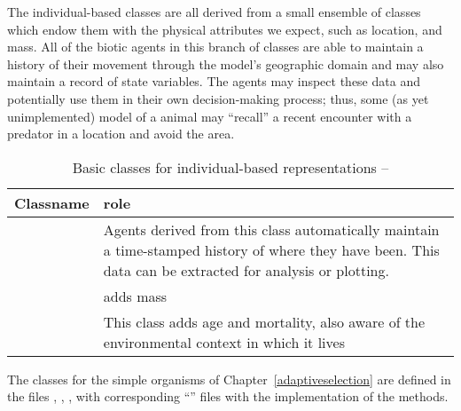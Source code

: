 The individual-based classes are all derived from a small ensemble of
classes which endow them with the physical attributes we expect, such
as location, and mass. All of the biotic agents in this branch of
classes are able to maintain a history of their movement through the
model's geographic domain and may also maintain a record of state
variables. The agents may inspect these data and potentially use them
in their own decision-making process; thus, some (as yet
unimplemented) model of a animal may ``recall'' a recent encounter
with a predator in a location and avoid the area.

\begin{table}[H]
\begin{center}
  \caption{Basic classes for individual-based rep\-re\-senta\-tions
  -- \label{classtable3}} 
  \begin{tabular}{l L{7cm}}
    \toprule 
    \textbf{Classname} & \textbf{role} \\
    \midrule
     & Agents derived from this class automatically
    maintain a time-stamped history of where they have been. This data
    can be extracted for analysis or plotting.\\
     & adds mass \\
     & This class adds age and mortality, also aware of the
    environmental context in which it lives \\
    \bottomrule
\end{tabular}
\end{center}
\end{table}

The classes for the simple organisms of
Chapter~\ref{adaptiveselection} are defined in the files
, ,
, with corresponding
``'' files with the implementation of the methods.

